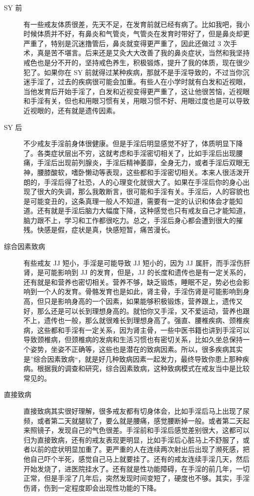 \begin{description}
    \item[SY 前] 有一些戒友体质很差，先天不足，在发育前就已经有病了。比如我吧，我小时候体质并不好，有鼻炎和气管炎，气管炎在发育时带好了，但是鼻炎却更严重了，特别是沉迷撸管后，鼻炎就变得更严重了，因此还做过 3 次手术，真是苦不堪言。后来还是艾灸大大改善了我的鼻炎症状，当然和我坚持戒色也是分不开的，坚持戒色养生，积极锻炼，提升了我的体质，现在很少犯了。如果你在 SY 前就得过某种疾病，那就不是手淫导致的，不过当你沉迷手淫了，过去的疾病很可能会加重。有些人在小学时就有白发和近视眼，当他发育后开始手淫了，白发和近视变得更严重了，这让他很苦恼，近视眼和手淫有关，但也和用眼习惯有关，用眼习惯不好、用眼过度也是可以导致近视眼的，还有就是遗传因素。
    \item[SY 后] 不少戒友手淫前身体很健康。但是手淫后明显感觉不好了，体质明显下降了。各类症状层出不穷，这就考虑和手淫密切相关了，比如手淫后出现腰痛，手淫后出现前列腺炎，手淫后精神萎靡，全身无力，或者手淫后双眼无神，腰膝酸软，嗜卧懒动等表现，这些都和手淫密切相关。本来人很活泼开朗的，手淫后得了社恐，人的心理变化就很大了。如果在手淫后你的身心出现了很大的失调，那么我敢断言，很可能和手淫有关。手淫后，人的容貌也是可能变丑的，这条真理一般人不知道，需要有一定的认识和体会才能知道。还有就是手淫后脑力大幅度下降，这种感觉也只有戒友自己才能知道，脑力跟不上，学习和工作都很吃力。总之，手淫后身心都会遭到很大的摧残。快感是假，症状是真，快感短暂，痛苦漫长。
    \item[综合因素致病] 有些戒友 JJ 短小，手淫是可能导致 JJ 短小的，因为 JJ 属肝，而手淫伤肝肾，是可能影响到 JJ 的发育，但是，JJ 的长度和遗传也是有一定关系的，还有就是和营养也密切相关。营养不够，缺乏锻炼，睡眠不足，势必也会影响到一个人的发育。骨骼发育也是如此，肾主骨，手淫伤肾是可能影响到身高，但只是影响身高的一个因素，如果能够积极锻炼，营养跟上，遗传又好，那么还是可以长到理想身高的。就怕你又手淫，又不爱运动，营养也跟不上，遗传也一般，那么就很难长到理想身高了。强直、腰椎疾病、颈椎疾病，这些都和手淫有一定关系，因为肾主骨，一些中医书籍也讲到手淫可以导致颈椎病，但颈椎病的发病和生活习惯也有密切关系，比如久坐总保持一个姿势，坐姿不正确等，这些也是潜在的致病因素。所以，很多疾病其实是”综合因素致病“，就是好几种致病因素一起发力，最终导致你患上那种疾病。根据我的调查和研究，综合因素致病，这种致病模式在戒友当中是比较常见的。
    \item[直接致病] 直接致病其实很好理解，很多戒友都有切身体会，比如手淫后马上出现了尿频，或者第二天就腿软了，要么就是腰痛，感觉腰断掉一般。或者第二天起来照镜子，发现自己的气色很差。手淫前和手淫后感觉差别很大，这都可以归为直接致病，还有的戒友表现更明显，比如手淫后心脏马上不舒服了，或者以前的症状明显加重了。更严重的人在连续两次射出后出现了濒死感，把他自己吓个半死，感觉自己马上就要挂了。还有的戒友连续手淫几天，然后开始发烧了，进医院挂水了。还有就是性功能障碍，在手淫的前几年，一切正常，但是手淫了几年后，突然发现时间变短了，硬度也不够。其实，手淫伤肾，伤到一定程度即会出现性功能的下降。

\end{description}
